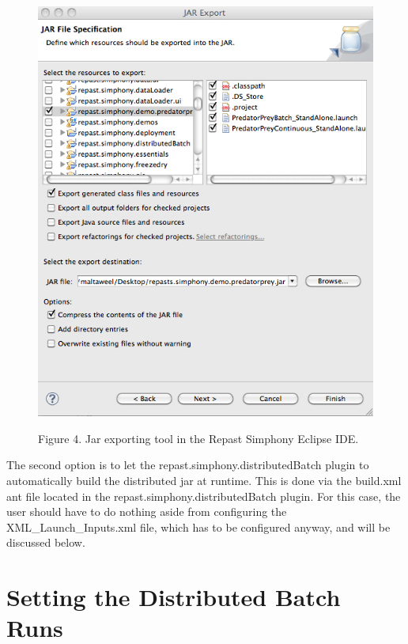 \documentclass[12pt]{article}
\begin{document}
\begin{figure}[!t]
\begin{center}
\includegraphics [width=\textwidth]{images/Figure4.jpg}
\label{cablehealth}
\begin{minipage}{.9\textwidth}Figure 4. Jar exporting tool in the Repast Simphony Eclipse IDE.
\end{minipage}
\end{center}
\end{figure}

The second option is to let the repast.simphony.distributedBatch
plugin to automatically build the distributed jar at runtime. This is
done via the build.xml ant file located in the
repast.simphony.distributedBatch plugin. For this case, the user
should have to do nothing aside from configuring the
XML\_Launch\_Inputs.xml file, which has to be configured anyway, and
will be discussed below.

\section{Setting the Distributed Batch Runs}
\end{document}
